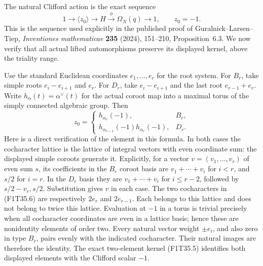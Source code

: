 The natural Clifford action is the exact sequence
\[
 1\longrightarrow\langle z_0\rangle
 \longrightarrow H\xrightarrow{\ \phi\ }
       \Omega_N(q)\longrightarrow1,
 \qquad z_0=-1.
 \tag{F1T35.5}
\]
This is the sequence used explicitly in the
published proof of Guralnick--Larsen--Tiep,
\emph{Inventiones mathematicae} \textbf{235}
(2024), 151--210, Proposition~6.3. We now verify
that all actual lifted automorphisms preserve its
displayed kernel, above the triality range.

Use the standard Euclidean coordinates
\(e_1,\ldots,e_r\) for the root system. For
\(B_r\), take simple roots
\(e_i-e_{i+1}\) and \(e_r\). For \(D_r\), take
\(e_i-e_{i+1}\) and the last root
\(e_{r-1}+e_r\). Write \(h_\alpha(t)=\alpha^\vee(t)\)
for the actual coroot map into a maximal torus
of the simply connected algebraic group. Then
\[
 z_0=
 \begin{cases}
 h_{\alpha_r}(-1),&B_r,\\
 h_{\alpha_{r-1}}(-1)h_{\alpha_r}(-1),&D_r.
 \end{cases}
 \tag{F1T35.6}
\]
Here is a direct verification of the element in
this formula. In both cases the cocharacter
lattice is the lattice of integral vectors with
even coordinate sum: the displayed simple
coroots generate it. Explicitly, for a vector
\(v=(v_1,\ldots,v_r)\) of even sum \(s\), its
coefficients in the \(B_r\) coroot basis are
\(v_1+\cdots+v_i\) for \(i<r\), and \(s/2\)
for \(i=r\). In the \(D_r\) basis they are
\(v_1+\cdots+v_i\) for \(i\le r-2\), followed
by \(s/2-v_r,s/2\). Substitution gives \(v\)
in each case. The two cocharacters in
(F1T35.6) are respectively \(2e_r\) and
\(2e_{r-1}\). Each belongs to this lattice and
does not belong to twice this lattice. Evaluation
at \(-1\) in a torus is trivial precisely when
all cocharacter coordinates are even in a lattice
basis; hence these are nonidentity elements of
order two. Every natural vector weight
\(\pm e_i\), and also zero in type \(B_r\),
pairs evenly with the indicated cocharacter.
Their natural images are therefore the identity.
The exact two-element kernel (F1T35.5) identifies
both displayed elements with the Clifford scalar
\(-1\).

